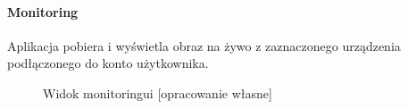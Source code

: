 \documentclass[polish,bachelor,a4paper,oneside]{ppfcmthesis}
\begin{document}
    \paragraph{Monitoring}
    Aplikacja pobiera i wyświetla obraz na żywo z zaznaczonego urządzenia podłączonego do konto użytkownika.
    \nopagebreak
    \begin{figure}[H]
        \centering
        \hfill
        \hfill
        \caption{Widok monitoringui [opracowanie własne]}
        \label{fig:monitoring}
    \end{figure}
\end{document}
